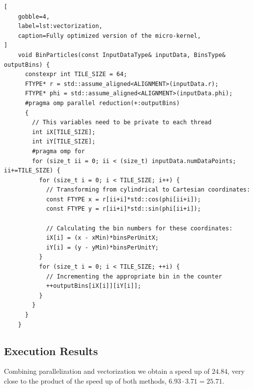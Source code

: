 \documentclass[
    12pt, %
]{fphw}
\begin{document}
\begin{lstlisting}[
    gobble=4,
    label=lst:vectorization,
    caption=Fully optimized version of the micro-kernel,
]
    void BinParticles(const InputDataType& inputData, BinsType& outputBins) {
      constexpr int TILE_SIZE = 64;
      FTYPE* r = std::assume_aligned<ALIGNMENT>(inputData.r);
      FTYPE* phi = std::assume_aligned<ALIGNMENT>(inputData.phi);
      #pragma omp parallel reduction(+:outputBins)
      {
        // This variables need to be private to each thread
        int iX[TILE_SIZE];
        int iY[TILE_SIZE];
        #pragma omp for
        for (size_t ii = 0; ii < (size_t) inputData.numDataPoints; ii+=TILE_SIZE) {
          for (size_t i = 0; i < TILE_SIZE; i++) { 
            // Transforming from cylindrical to Cartesian coordinates:
            const FTYPE x = r[ii+i]*std::cos(phi[ii+i]);
            const FTYPE y = r[ii+i]*std::sin(phi[ii+i]);

            // Calculating the bin numbers for these coordinates:
            iX[i] = (x - xMin)*binsPerUnitX;
            iY[i] = (y - yMin)*binsPerUnitY;
          }
          for (size_t i = 0; i < TILE_SIZE; ++i) {
            // Incrementing the appropriate bin in the counter
            ++outputBins[iX[i]][iY[i]];
          }
        }
      }
    }

\end{lstlisting}

\subsection{Execution Results}

    Combining parallelization and vectorization we obtain a speed up of $24.84$,
very close to the product of the speed up of both methods, $6.93\cdot 3.71 = 25.71$.
\end{document}
